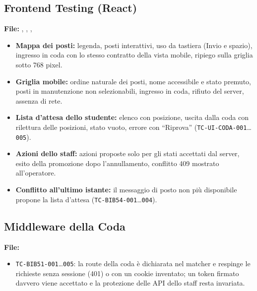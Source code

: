 \documentclass[11pt,a4paper,oneside,openany]{book}
\begin{document}
\subsection{Frontend Testing (React)}

\textbf{File:} ,
, ,

\begin{itemize}
  \item \textbf{Mappa dei posti:} legenda, posti interattivi, uso da tastiera
        (Invio e spazio), ingresso in coda con lo stesso contratto della vista
        mobile, ripiego sulla griglia sotto 768 pixel.
  \item \textbf{Griglia mobile:} ordine naturale dei posti, nome accessibile e
        stato premuto, posti in manutenzione non selezionabili, ingresso in
        coda, rifiuto del server, assenza di rete.
  \item \textbf{Lista d'attesa dello studente:} elenco con posizione,
        uscita dalla coda con rilettura delle posizioni, stato vuoto, errore
        con \enquote{Riprova} (\texttt{TC-UI-CODA-001}\dots\texttt{005}).
  \item \textbf{Azioni dello staff:} azioni proposte solo per gli stati
        accettati dal server, esito della promozione dopo l'annullamento,
        conflitto 409 mostrato all'operatore.
  \item \textbf{Conflitto all'ultimo istante:} il messaggio di posto non più
        disponibile propone la lista d'attesa (\texttt{TC-BIB54-001}\dots\texttt{004}).
\end{itemize}

\subsection{Middleware della Coda}

\textbf{File:} 

\begin{itemize}
  \item \texttt{TC-BIB51-001}\dots\texttt{005}: la route della coda è
        dichiarata nel matcher e respinge le richieste senza sessione (401)
        o con un cookie inventato; un token firmato davvero viene accettato e
        la protezione delle API dello staff resta invariata.
\end{itemize}
\end{document}
